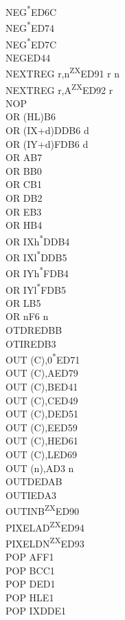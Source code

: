 \documentclass[twoside,openright,a4paper]{book}
\begin{document}
\begin{multicols}{3}
{\begin{tabbing}
	NEG\textsuperscript{*}\>ED6C\\
	NEG\textsuperscript{*}\>ED74\\
	NEG\textsuperscript{*}\>ED7C\\
	NEG\>ED44\\
	NEXTREG r,n\textsuperscript{ZX}\>ED91 r n\\
	NEXTREG r,A\textsuperscript{ZX}\>ED92 r\\
	NOP\\
	OR (HL)\>B6\\
	OR (IX+d)\>DDB6 d\\
	OR (IY+d)\>FDB6 d\\
	OR A\>B7\\
	OR B\>B0\\
	OR C\>B1\\
	OR D\>B2\\
	OR E\>B3\\
	OR H\>B4\\
	OR IXh\textsuperscript{*}\>DDB4\\
	OR IXl\textsuperscript{*}\>DDB5\\
	OR IYh\textsuperscript{*}\>FDB4\\
	OR IYl\textsuperscript{*}\>FDB5\\
	OR L\>B5\\
	OR n\>F6 n\\
	OTDR\>EDBB\\
	OTIR\>EDB3\\
	OUT (C),0\textsuperscript{*}\>ED71\\
	OUT (C),A\>ED79\\
	OUT (C),B\>ED41\\
	OUT (C),C\>ED49\\
	OUT (C),D\>ED51\\
	OUT (C),E\>ED59\\
	OUT (C),H\>ED61\\
	OUT (C),L\>ED69\\
	OUT (n),A\>D3 n\\
	OUTD\>EDAB\\
	OUTI\>EDA3\\
	OUTINB\textsuperscript{ZX}\>ED90\\
	PIXELAD\textsuperscript{ZX}\>ED94\\
	PIXELDN\textsuperscript{ZX}\>ED93\\
	POP AF\>F1\\
	POP BC\>C1\\
	POP DE\>D1\\
	POP HL\>E1\\
	POP IX\>DDE1\\

\end{tabbing}}
\end{multicols}
\end{document}

